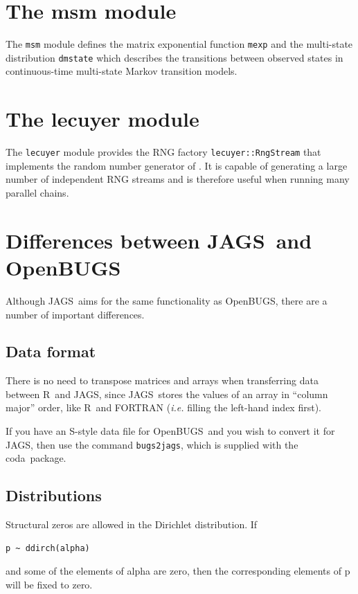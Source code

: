 \documentclass[11pt, a4paper, titlepage]{report}
\newcommand{\JAGS}{\textsf{JAGS}}
\newcommand{\OpenBUGS}{\textsf{OpenBUGS}}
\newcommand{\R}{\textsf{R}}
\newcommand{\CODA}{\textsf{coda}}
\begin{document}
{\chapter{The msm module}

The \texttt{msm} module defines the matrix exponential function
\texttt{mexp} and the multi-state distribution \texttt{dmstate} which
describes the transitions between observed states in continuous-time
multi-state Markov transition models. 

\chapter{The lecuyer module}

The \texttt{lecuyer} module provides the RNG factory
\texttt{lecuyer::RngStream} that implements the random number generator of
\citet{lecuyer02}.  It is capable of generating a large number of
independent RNG streams and is therefore useful when running many
parallel chains.

\appendix

\chapter{Differences between \JAGS\ and \OpenBUGS}

Although \JAGS\ aims for the same functionality as \OpenBUGS, there are
a number of important differences.

\section{Data format}

There is no need to transpose matrices and arrays when transferring
data between \R\ and \JAGS, since \JAGS\ stores the values of an array
in ``column major'' order, like \R\ and FORTRAN ({\em i.e.} filling
the left-hand index first).

If you have an \textsf{S}-style data file for \OpenBUGS\ and you wish
to convert it for \JAGS, then use the command \texttt{bugs2jags},
which is supplied with the \CODA\ package.

\section{Distributions}

Structural zeros are allowed in the Dirichlet distribution. If
\begin{verbatim}
p ~ ddirch(alpha)
\end{verbatim}
and some of the elements of alpha are zero, then the corresponding
elements of p will be fixed to zero.

}
\end{document}

